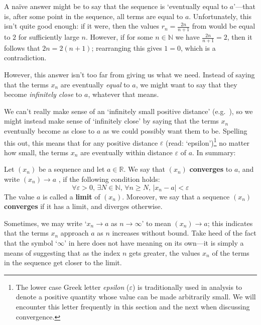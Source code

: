 A na\"{i}ve answer might be to say that the sequence is `eventually equal to $a$'---that is, after some point in the sequence, all terms are equal to $a$. Unfortunately, this isn't quite good enough: if it were, then the values $r_n = \frac{2n}{n+1}$ from  would be equal to $2$ for sufficiently large $n$. However, if for some $n \in \mathbb{N}$ we have $\frac{2n}{n+1}=2$, then it follows that $2n=2(n+1)$; rearranging this gives $1=0$, which is a contradiction.

However, this answer isn't too far from giving us what we need. Instead of saying that the terms $x_n$ are eventually \textit{equal} to $a$, we might want to say that they become \textit{infinitely close} to $a$, whatever that means.

We can't really make sense of an `infinitely small positive distance' (e.g.\ ), so we might instead make sense of `infinitely close' by saying that the terms $x_n$ eventually become as close to $a$ as we could possibly want them to be. Spelling this out, this means that for any positive distance $\varepsilon$  (read: `epsilon')\footnote{The lower case Greek letter \textit{epsilon} ($\varepsilon$) is traditionally used in analysis to denote a positive quantity whose value can be made arbitrarily small. We will encounter this letter frequently in this section and the next when discussing convergence.} no matter how small, the terms $x_n$ are eventually within distance $\varepsilon$ of $a$. In summary:

\begin{definition}
\label{defConvergenceOfSequence}
\label{defLimitOfSequence}
Let $(x_n)$ be a sequence and let $a \in \mathbb{R}$. We say that $(x_n)$ \textbf{converges} to $a$, and write $(x_n) \to a$ , if the following condition holds:
\[ \forall \varepsilon > 0,\, \exists N \in \mathbb{N},\, \forall n \ge N,\, |x_n-a| < \varepsilon \]
The value $a$ is called a \textbf{limit} of $(x_n)$. Moreover, we say that a sequence $(x_n)$ \textbf{converges} if it has a limit, and diverges otherwise.
\end{definition}

Sometimes, we may write `$x_n \to a$ as $n \to \infty$' to mean $(x_n) \to a$; this indicates that the terms $x_n$ approach $a$ as $n$ increases without bound. Take heed of the fact that the symbol `$\infty$' in here does not have meaning on its own---it is simply a means of suggesting that as the index $n$ gets greater, the values $x_n$ of the terms in the sequence get closer to the limit.

